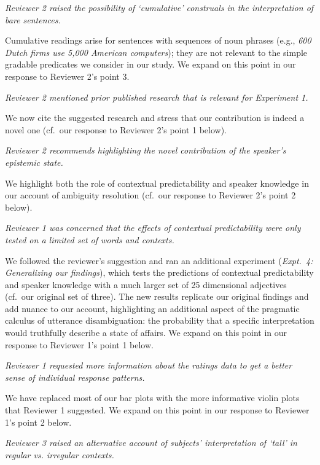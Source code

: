 \documentclass[12pt]{article}
\begin{document}
\item \emph{Reviewer 2 raised the possibility of `cumulative' construals in the interpretation of bare sentences.}

Cumulative readings arise for sentences with sequences of noun phrases (e.g., \emph{600 Dutch firms use 5,000 American computers}); they are not relevant to the simple gradable predicates we consider in our study. We expand on this point in our response to Reviewer 2's point 3.

\item \emph{Reviewer 2 mentioned prior published research that is relevant for Experiment 1.}

We now cite the suggested research and stress that our contribution is indeed a novel one (cf.~our response to Reviewer 2's point 1 below).

\item \emph{Reviewer 2 recommends highlighting the novel contribution of the speaker's epistemic state.}

We highlight both the role of contextual predictability and speaker knowledge in our account of ambiguity resolution (cf.~our response to Reviewer 2's point 2 below).

\item \emph{Reviewer 1 was concerned that the effects of contextual predictability were only tested on a limited set of words and contexts.}

We followed the reviewer's suggestion and ran an additional experiment (\emph{Expt.~4: Generalizing our findings}), which tests the predictions of contextual predictability and speaker knowledge with a much larger set of 25 dimensional adjectives (cf.~our original set of three). The new results replicate our original findings and add nuance to our account, highlighting an additional aspect of the pragmatic calculus of utterance disambiguation: the probability that a specific interpretation would truthfully describe a state of affairs. We expand on this point in our response to Reviewer 1's point 1 below.

\item \emph{Reviewer 1 requested more information about the ratings data to get a better sense of individual response patterns.}

We have replaced most of our bar plots with the more informative violin plots that Reviewer 1 suggested. We expand on this point in our response to Reviewer 1's point 2 below.

\item \emph{Reviewer 3 raised an alternative account of subjects' interpretation of `tall' in regular vs. irregular contexts.}
\end{document}
